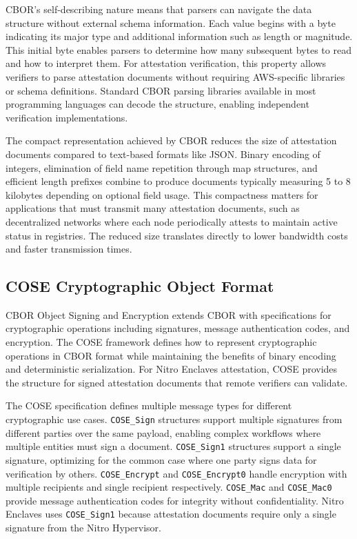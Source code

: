 CBOR's self-describing nature means that parsers can navigate the data structure without external schema information. Each value begins with a byte indicating its major type and additional information such as length or magnitude. This initial byte enables parsers to determine how many subsequent bytes to read and how to interpret them. For attestation verification, this property allows verifiers to parse attestation documents without requiring AWS-specific libraries or schema definitions. Standard CBOR parsing libraries available in most programming languages can decode the structure, enabling independent verification implementations.

The compact representation achieved by CBOR reduces the size of attestation documents compared to text-based formats like JSON. Binary encoding of integers, elimination of field name repetition through map structures, and efficient length prefixes combine to produce documents typically measuring 5 to 8 kilobytes depending on optional field usage. This compactness matters for applications that must transmit many attestation documents, such as decentralized networks where each node periodically attests to maintain active status in registries. The reduced size translates directly to lower bandwidth costs and faster transmission times.

\subsection{COSE Cryptographic Object Format}

CBOR Object Signing and Encryption extends CBOR with specifications for cryptographic operations including signatures, message authentication codes, and encryption. The COSE framework defines how to represent cryptographic operations in CBOR format while maintaining the benefits of binary encoding and deterministic serialization. For Nitro Enclaves attestation, COSE provides the structure for signed attestation documents that remote verifiers can validate.

The COSE specification defines multiple message types for different cryptographic use cases. \texttt{COSE\_Sign} structures support multiple signatures from different parties over the same payload, enabling complex workflows where multiple entities must sign a document. \texttt{COSE\_Sign1} structures support a single signature, optimizing for the common case where one party signs data for verification by others. \texttt{COSE\_Encrypt} and \texttt{COSE\_Encrypt0} handle encryption with multiple recipients and single recipient respectively. \texttt{COSE\_Mac} and \texttt{COSE\_Mac0} provide message authentication codes for integrity without confidentiality. Nitro Enclaves uses \texttt{COSE\_Sign1} because attestation documents require only a single signature from the Nitro Hypervisor.

